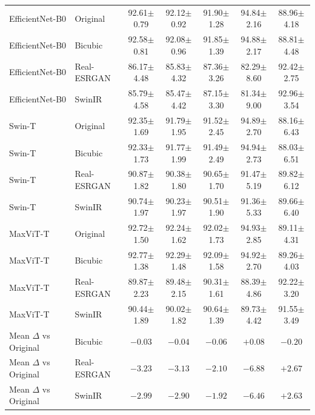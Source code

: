 \documentclass[11pt]{article}
\begin{document}
{\begin{longtable}{@{}llccccc@{}}
\addlinespace
EfficientNet-B0  & Original    & 92.61$\pm$0.79 & 92.12$\pm$0.92 & 91.90$\pm$1.28 & 94.84$\pm$2.16 & 88.96$\pm$4.18 \\
EfficientNet-B0  & Bicubic     & 92.58$\pm$0.81 & 92.08$\pm$0.96 & 91.85$\pm$1.39 & 94.88$\pm$2.17 & 88.81$\pm$4.48 \\
EfficientNet-B0  & Real-ESRGAN & 86.17$\pm$4.48 & 85.83$\pm$4.32 & 87.36$\pm$3.26 & 82.29$\pm$8.60 & 92.42$\pm$2.75 \\
EfficientNet-B0  & SwinIR      & 85.79$\pm$4.58 & 85.47$\pm$4.42 & 87.15$\pm$3.30 & 81.34$\pm$9.00 & 92.96$\pm$3.54 \\
\addlinespace
Swin-T           & Original    & 92.35$\pm$1.69 & 91.79$\pm$1.95 & 91.52$\pm$2.45 & 94.89$\pm$2.70 & 88.16$\pm$6.43 \\
Swin-T           & Bicubic     & 92.33$\pm$1.73 & 91.77$\pm$1.99 & 91.49$\pm$2.49 & 94.94$\pm$2.73 & 88.03$\pm$6.51 \\
Swin-T           & Real-ESRGAN & 90.87$\pm$1.82 & 90.38$\pm$1.80 & 90.65$\pm$1.70 & 91.47$\pm$5.19 & 89.82$\pm$6.12 \\
Swin-T           & SwinIR      & 90.74$\pm$1.97 & 90.23$\pm$1.97 & 90.51$\pm$1.90 & 91.36$\pm$5.33 & 89.66$\pm$6.40 \\
\addlinespace
MaxViT-T         & Original    & 92.72$\pm$1.50 & 92.24$\pm$1.62 & 92.02$\pm$1.73 & 94.93$\pm$2.85 & 89.11$\pm$4.31 \\
MaxViT-T         & Bicubic     & 92.77$\pm$1.38 & 92.29$\pm$1.48 & 92.09$\pm$1.58 & 94.92$\pm$2.70 & 89.26$\pm$4.03 \\
MaxViT-T         & Real-ESRGAN & 89.87$\pm$2.23 & 89.48$\pm$2.15 & 90.31$\pm$1.61 & 88.39$\pm$4.86 & 92.22$\pm$3.20 \\
MaxViT-T         & SwinIR      & 90.44$\pm$1.89 & 90.02$\pm$1.82 & 90.64$\pm$1.39 & 89.73$\pm$4.42 & 91.55$\pm$3.49 \\
\midrule
Mean $\Delta$ vs Original & Bicubic & $-0.03$ & $-0.04$ & $-0.06$ & $+0.08$ & $-0.20$ \\
Mean $\Delta$ vs Original & Real-ESRGAN & $-3.23$ & $-3.13$ & $-2.10$ & $-6.88$ & $+2.67$ \\
Mean $\Delta$ vs Original & SwinIR & $-2.99$ & $-2.90$ & $-1.92$ & $-6.46$ & $+2.63$ \\
\bottomrule
\end{longtable}
}
\end{document}
